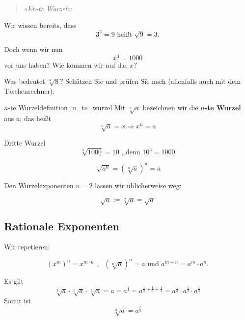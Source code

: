 \begin{verse}
\textit{«En-te Wurzel»}:
\end{verse}

Wir wissen bereits, dass
$$3^2 = 9 \textrm{ heißt } \sqrt{9} = 3.$$



Doch wenn wir nun
$$x^3 = 1000$$
vor uns haben? Wie kommen wir auf das $x$?



Was bedeutet $\sqrt[3]{8}$? Schätzen Sie und prüfen Sie nach (allenfalls auch mit dem Taschenrechner):




\newpage
\begin{definition}{$n$-te Wurzel}{definition_n_te_wurzel}
Mit $\sqrt[n]{a}$ bezeichnen wir die $n$\textbf{-te Wurzel} aus $a$; das heißt
$$\sqrt[n]{a} = x \Rightarrow x^n = a$$
\end{definition}

\begin{beispiel}{Dritte Wurzel}{}
$$\sqrt[3]{1000} = 10 \textrm{ , denn } 10^3 = 1000$$
\end{beispiel}

\begin{gesetz}{}{}
$$\sqrt[n]{a^n} = \left(\sqrt[n]a\right)^n = a$$
\end{gesetz}


\begin{definition}{}{}
Den Wurzelexponenten $n=2$ lassen wir üblicherweise weg:

$$\sqrt{a} := \sqrt[2]{a} = \sqrt{a}$$
\end{definition}

\newpage


\subsection{Rationale Exponenten}

Wir repetieren:


$$(x^m)^n = x^{m\cdot n}\ \ \textrm{, }\ \ \left(\sqrt[n]{a}\right)^n
= a \textrm{ und } a^{m+n} =a^m\cdot{}a^n.$$

\begin{beispiel}{}{}
Es gilt
$$\sqrt[3]{a} \cdot{}\sqrt[3]{a} \cdot{}\sqrt[3]{a} = a = a^1 =
a^{\frac13 +\frac13 +\frac13} = a^\frac13 \cdot{} a^\frac13 \cdot
a^\frac13$$
Somit ist
$$\sqrt[3]{a} = a^\frac13$$
\end{beispiel}



